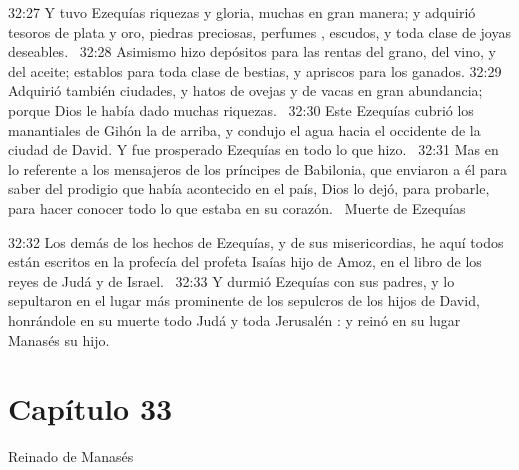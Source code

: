 																																32:27 Y tuvo Ezequías riquezas y gloria, muchas en gran manera; y adquirió tesoros de plata y oro, piedras preciosas, perfumes , escudos, y toda clase de joyas deseables.  
																																32:28 Asimismo hizo depósitos para las rentas del grano, del vino, y del aceite; establos para toda clase de bestias, y apriscos para los ganados. 
																																32:29 Adquirió también ciudades, y hatos de ovejas y de vacas en gran abundancia; porque Dios le había dado muchas riquezas.  
																																32:30 Este Ezequías cubrió los manantiales de Gihón la de arriba, y condujo el agua hacia el occidente de la ciudad de David. Y fue prosperado Ezequías en todo lo que hizo.  
																																32:31 Mas en lo referente a los mensajeros de los príncipes de Babilonia, que enviaron a él para saber del prodigio que había acontecido en el país, Dios lo dejó, para probarle, para hacer conocer todo lo que estaba en su corazón.  
																																Muerte de Ezequías 
																																
																																32:32 Los demás de los hechos de Ezequías, y de sus misericordias, he aquí todos están escritos en la profecía del profeta Isaías hijo de Amoz, en el libro de los reyes de Judá y de Israel.  
																																32:33 Y durmió Ezequías con sus padres, y lo sepultaron en el lugar más prominente de los sepulcros de los hijos de David, honrándole en su muerte todo Judá y toda Jerusalén : y reinó en su lugar Manasés su hijo.  
																																\section*{Capítulo 33}
																																	Reinado de Manasés 
																																	
